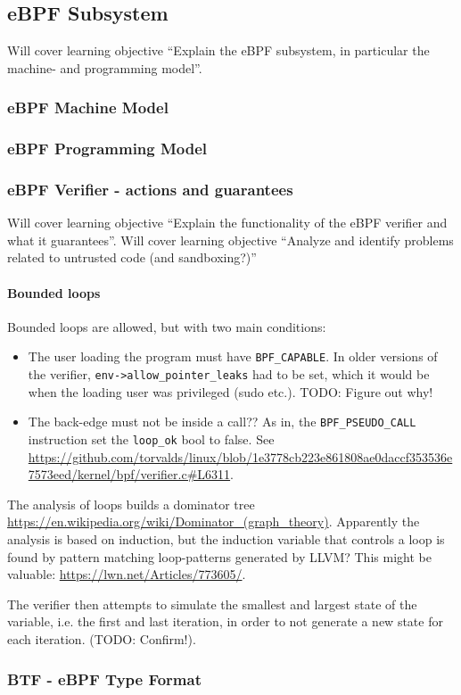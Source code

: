 
\subsection{eBPF Subsystem}
\label{subsec:ebpf_subsystem}
Will cover learning objective ``Explain the eBPF subsystem, in particular the machine- and programming model''.

\subsubsection{eBPF Machine Model}
\subsubsection{eBPF Programming Model}
\subsubsection{eBPF Verifier - actions and guarantees}
Will cover learning objective ``Explain the functionality of the eBPF verifier and what it guarantees''.
Will cover learning objective ``Analyze and identify problems related to untrusted code (and sandboxing?)''

\paragraph{Bounded loops}
Bounded loops are allowed, but with two main conditions:
\begin{itemize}
\item The user loading the program must have \texttt{BPF\_CAPABLE}. In older versions of the verifier, \texttt{env->allow\_pointer\_leaks} had to be set, which it would be when the loading user was privileged (sudo etc.).
  TODO: Figure out why!
  

\item The back-edge must not be inside a call?? As in, the \texttt{BPF\_PSEUDO\_CALL} instruction set the \texttt{loop\_ok} bool to false. 
See \url{ https://github.com/torvalds/linux/blob/1e3778cb223e861808ae0daccf353536e7573eed/kernel/bpf/verifier.c#L6311}.
\end{itemize}

The analysis of loops builds a dominator tree \url{https://en.wikipedia.org/wiki/Dominator_(graph_theory)}.
Apparently the analysis is based on induction, but the induction variable that controls a loop is found by pattern matching loop-patterns generated by LLVM?
This might be valuable: \url{https://lwn.net/Articles/773605/}.

The verifier then attempts to simulate the smallest and largest state of the variable, i.e. the first and last iteration, in order to not generate a new state for each iteration. (TODO: Confirm!).


\subsubsection{BTF - eBPF Type Format}


